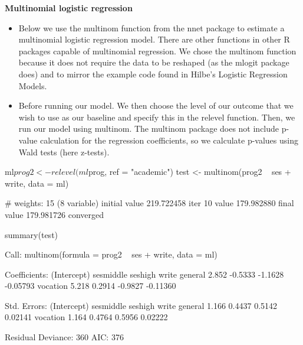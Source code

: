 \begin{frame}[fragile]

\textbf{Multinomial logistic regression}
\begin{itemize}
\item 
Below we use the multinom function from the nnet package to estimate a multinomial logistic regression model. There are other functions in other R packages capable of multinomial regression. We chose the multinom function because it does not require the data to be reshaped (as the mlogit package does) and to mirror the example code found in Hilbe's Logistic Regression Models.
\item   
Before running our model. We then choose the level of our outcome that we wish to use as our baseline and specify this in the relevel function. Then, we run our model using multinom. The multinom package does not include p-value calculation for the regression coefficients, so we calculate p-values using Wald tests (here z-tests).
 
\end{itemize}
\end{frame}
\begin{frame}[fragile]

ml$prog2 <- relevel(ml$prog, ref = "academic")
test <- multinom(prog2 ~ ses + write, data = ml)
 
 # weights:  15 (8 variable)
 initial  value 219.722458 
 iter  10 value 179.982880
 final  value 179.981726 
 converged
\end{frame}
\begin{frame}[fragile] 
summary(test)
 
 Call:
 multinom(formula = prog2 ~ ses + write, data = ml)
 
 Coefficients:
          (Intercept) sesmiddle seshigh    write
 general        2.852   -0.5333 -1.1628 -0.05793
 vocation       5.218    0.2914 -0.9827 -0.11360
\end{frame}
\begin{frame}[fragile] 
 Std. Errors:
          (Intercept) sesmiddle seshigh   write
 general        1.166    0.4437  0.5142 0.02141
 vocation       1.164    0.4764  0.5956 0.02222
 
 Residual Deviance: 360 
 AIC: 376
\end{frame}
